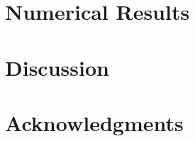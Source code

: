 \documentclass{anstrans}
\begin{document}
\section{Numerical Results}

\section{Discussion}

\section{Acknowledgments}




\end{document}
